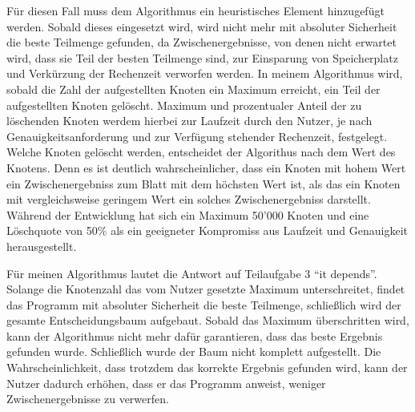 Für diesen Fall muss dem Algorithmus ein heuristisches Element hinzugefügt werden. Sobald dieses eingesetzt wird, wird nicht mehr mit absoluter Sicherheit die beste Teilmenge gefunden, da Zwischenergebnisse, von denen nicht erwartet wird, dass sie Teil der besten Teilmenge sind, zur Einsparung von Speicherplatz und Verkürzung der Rechenzeit verworfen werden. In meinem Algorithmus wird, sobald die Zahl der aufgestellten Knoten ein Maximum erreicht, ein Teil der aufgestellten Knoten gelöscht. Maximum und prozentualer Anteil der zu löschenden Knoten werdem hierbei zur Laufzeit durch den Nutzer, je nach Genauigkeitsanforderung und zur Verfügung stehender Rechenzeit, festgelegt. Welche Knoten gelöscht werden, entscheidet der Algorithus nach dem Wert des Knotens. Denn es ist deutlich wahrscheinlicher, dass ein Knoten mit hohem Wert ein Zwischenergebniss zum Blatt mit dem höchsten Wert ist, als das ein Knoten mit vergleichsweise geringem Wert ein solches Zwischenergebniss darstellt. Während der Entwicklung hat sich ein Maximum 50'000 Knoten und eine Löschquote von 50\% als ein geeigneter Kompromiss aus Laufzeit und Genauigkeit herausgestellt.

Für meinen Algorithmus lautet die Antwort auf Teilaufgabe 3 "`it depends"'. Solange die Knotenzahl das vom Nutzer gesetzte Maximum unterschreitet, findet das Programm mit absoluter Sicherheit die beste Teilmenge, schließlich wird der gesamte Entscheidungsbaum aufgebaut. Sobald das Maximum überschritten wird, kann der Algorithmus nicht mehr dafür garantieren, dass das beste Ergebnis gefunden wurde. Schließlich wurde der Baum nicht komplett aufgestellt. Die Wahrscheinlichkeit, dass trotzdem das korrekte Ergebnis gefunden wird, kann der Nutzer dadurch erhöhen, dass er das Programm anweist, weniger Zwischenergebnisse zu verwerfen.